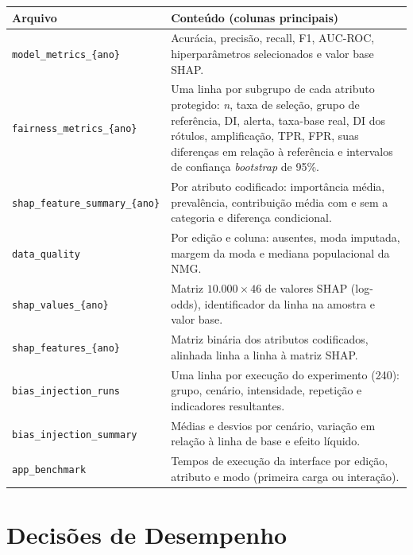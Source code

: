 \begin{quadro}[htbp]
\centering
\caption{Contrato de dados de saída (\texttt{data/outputs/})}
\label{qua:contrato_saida}
\small
\begin{tabular}{|>{\raggedright\arraybackslash}p{4.8cm}|>{\raggedright\arraybackslash}p{9.7cm}|}
\hline
\textbf{Arquivo} & \textbf{Conteúdo (colunas principais)} \\ \hline
\texttt{model\_metrics\_\{ano\}} & Acurácia, precisão, recall, F1, AUC-ROC, hiperparâmetros selecionados e valor base SHAP. \\ \hline
\texttt{fairness\_metrics\_\{ano\}} & Uma linha por subgrupo de cada atributo protegido: \textit{n}, taxa de seleção, grupo de referência, DI, alerta, taxa-base real, DI dos rótulos, amplificação, TPR, FPR, suas diferenças em relação à referência e intervalos de confiança \textit{bootstrap} de 95\%. \\ \hline
\texttt{shap\_feature\_\allowbreak summary\_\{ano\}} & Por atributo codificado: importância média, prevalência, contribuição média com e sem a categoria e diferença condicional. \\ \hline
\texttt{data\_quality} & Por edição e coluna: ausentes, moda imputada, margem da moda e mediana populacional da NMG. \\ \hline
\texttt{shap\_values\_\{ano\}} & Matriz $10.000 \times 46$ de valores SHAP (log-odds), identificador da linha na amostra e valor base. \\ \hline
\texttt{shap\_features\_\{ano\}} & Matriz binária dos atributos codificados, alinhada linha a linha à matriz SHAP. \\ \hline
\texttt{bias\_injection\_runs} & Uma linha por execução do experimento (240): grupo, cenário, intensidade, repetição e indicadores resultantes. \\ \hline
\texttt{bias\_injection\_summary} & Médias e desvios por cenário, variação em relação à linha de base e efeito líquido. \\ \hline
\texttt{app\_benchmark} & Tempos de execução da interface por edição, atributo e modo (primeira carga ou interação). \\ \hline
\end{tabular}
\end{quadro}

\section{Decisões de Desempenho}
\label{sec:desempenho}

